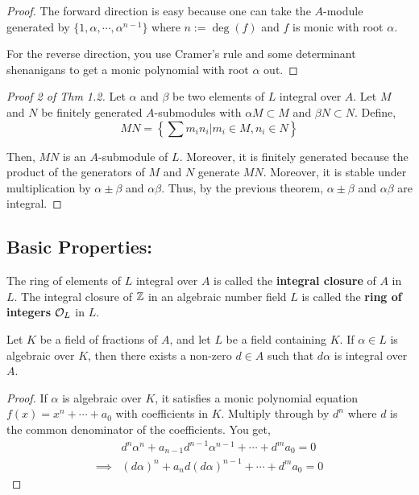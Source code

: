 \documentclass[12pt]{amsart}
\begin{document}
\begin{proof}
    The forward direction is easy because one can take the $A$-module generated by $\{1, \alpha, \cdots, \alpha^{n-1}\}$ where $n := \deg(f)$ and $f$ is monic with root $\alpha$. 
    
    For the reverse direction, you use Cramer's rule and some determinant shenanigans to get a monic polynomial with root $\alpha$ out. 
\end{proof}

\begin{proof}[Proof 2 of Thm 1.2]
    Let $\alpha$ and $\beta$ be two elements of $L$ integral over $A$. Let $M$ and $N$ be finitely generated $A$-submodules with $\alpha M \subset M$ and $\beta N \subset N$. Define, 
    \[ MN = \left\{ \sum m_in_i | m_i \in M, n_i \in N\right\}\]

    Then, $MN$ is an $A$-submodule of $L$. Moreover, it is finitely generated because the product of the generators of $M$ and $N$ generate $MN$. Moreover, it is stable under multiplication by $\alpha\pm \beta$ and $\alpha\beta$. Thus, by the previous theorem, $\alpha \pm \beta$ and $\alpha\beta$ are integral.
\end{proof}
\bbni

\subsection{Basic Properties:}
\begin{definition}
    The ring of elements of $L$ integral over $A$ is called the \textbf{integral closure} of $A$ in $L$. The integral closure of $\mathbb Z$ in an algebraic number field $L$ is called the \textbf{ring of integers} $\mathcal{O}_L$ in $L$. 
\end{definition}

\begin{proposition}
    Let $K$ be a field of fractions of $A$, and let $L$ be a field containing $K$. If $\alpha \in L$ is algebraic over $K$, then there exists a non-zero $d \in A$ such that $d\alpha$ is integral over $A$.
\end{proposition}
\begin{proof}
    If $\alpha$ is algebraic over $K$, it satisfies a monic polynomial equation $f(x) = x^n + \cdots + a_0$ with coefficients in $K$. Multiply through by $d^n$ where $d$ is the common denominator of the coefficients. You get, 
    \begin{align*}
        &d^n\alpha^n + a_{n-1}d^{n-1}\alpha^{n-1} + \cdots + d^ma_0 = 0 \\
        \implies &(d\alpha)^n + a_nd (d\alpha)^{n-1} + \cdots + d^ma_0 = 0 
    \end{align*}
\end{proof}
\end{document}
